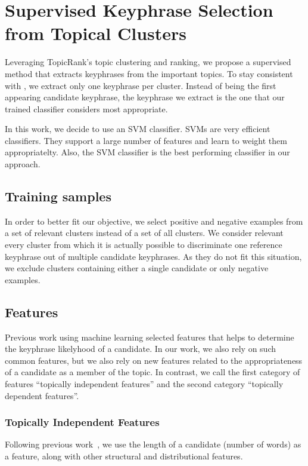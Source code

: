 \section{Supervised Keyphrase Selection\\from Topical Clusters}
\label{sec:supervised_keyphrase_selection_from_topical_clusters}
  Leveraging TopicRank's topic clustering and ranking, we propose a supervised
  method that extracts keyphrases from the important topics. To stay consistent
  with , we extract only one keyphrase per
  cluster. Instead of being the first appearing candidate keyphrase, the
  keyphrase we extract is the one that our trained classifier considers most
  appropriate.

  In this work, we decide to use an SVM classifier. SVMs are very efficient
  classifiers. They support a large number of features and learn to weight them
  appropriatelty. Also, the SVM classifier is the best performing classifier in
  our approach.

  \subsection{Training samples}
  \label{subsec:training_samples}
    In order to better fit our objective, we select positive and negative
    examples from a set of relevant clusters instead of a set of all clusters.
    We consider relevant every cluster from which it is actually possible to
    discriminate one reference keyphrase out of multiple candidate keyphrases.
    As they do not fit this situation, we exclude clusters containing either a
    single candidate or only negative examples.

  \subsection{Features}
  \label{subsec:features}
    Previous work using machine learning selected features that helps to
    determine the keyphrase likelyhood of a candidate. In our work, we also rely
    on such common features, but we also rely on new features related to the
    appropriateness of a candidate as a member of the topic. In contrast, we
    call the first category of features ``topically independent features'' and
    the second category ``topically dependent features''.

    \subsubsection{Topically Independent Features}
    \label{subsubsec:topically_independent_features}
      Following previous
      work~\cite{nguyen2007keadocumentstructure,lopez2010humb}, we use the
      length of a candidate (number of words) as a feature, along with other
      structural and distributional features.

